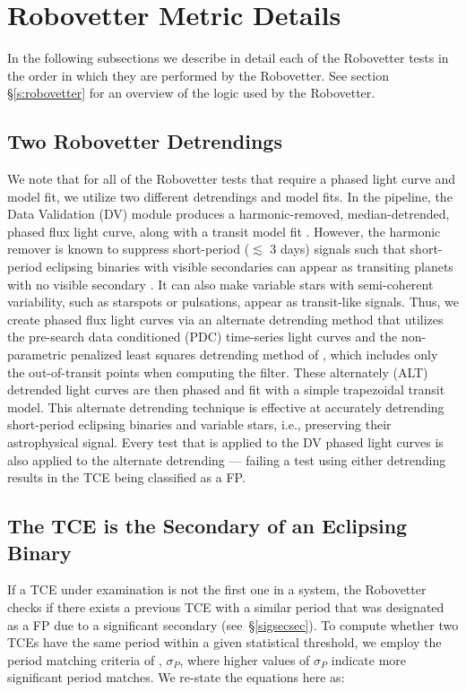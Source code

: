 \section{Robovetter Metric Details}
\label{s:metrics}
In the following subsections we describe in detail each of the Robovetter tests in the order in which they are performed by the Robovetter. See section \S\ref{s:robovetter} for an overview of the logic used by the Robovetter.

\subsection{Two Robovetter Detrendings}
We note that for all of the Robovetter tests that require a phased light curve and model fit, we utilize two different detrendings and model fits. In the \kepler{} pipeline, the Data Validation (DV) module produces a harmonic-removed, median-detrended, phased flux light curve, along with a transit model fit \citep{JenkinsKDPH,Wu2010}. However, the harmonic remover is known to suppress short-period ($\lesssim$ 3 days) signals such that short-period eclipsing binaries with visible secondaries can appear as transiting planets with no visible secondary \citep{Christiansen2013b}. It can also make variable stars with semi-coherent variability, such as starspots or pulsations, appear as transit-like signals. Thus, we create phased flux light curves via an alternate detrending method that utilizes the pre-search data conditioned (PDC) time-series light curves and the non-parametric penalized least squares detrending method of \citet{Garcia2010}, which includes only the out-of-transit points when computing the filter. These alternately (ALT) detrended light curves are then phased and fit with a simple trapezoidal transit model. This alternate detrending technique is effective at accurately detrending short-period eclipsing binaries and variable stars, i.e., preserving their astrophysical signal. Every test that is applied to the DV phased light curves is also applied to the alternate detrending --- failing a test using either detrending results in the TCE being classified as a FP.


\subsection{The TCE is the Secondary of an Eclipsing Binary}
\label{s:issecond}
If a TCE under examination is not the first one in a system, the Robovetter checks if there exists a previous TCE with a similar period that was designated as a FP due to a significant secondary (see~\S\ref{sigsecsec}). To compute whether two TCEs have the same period within a given statistical threshold, we employ the period matching criteria of \citet[][see equations 1-3]{Coughlin2014a}, $\sigma_{P}$, where higher values of $\sigma_{P}$ indicate more significant period matches. We re-state the equations here as:


